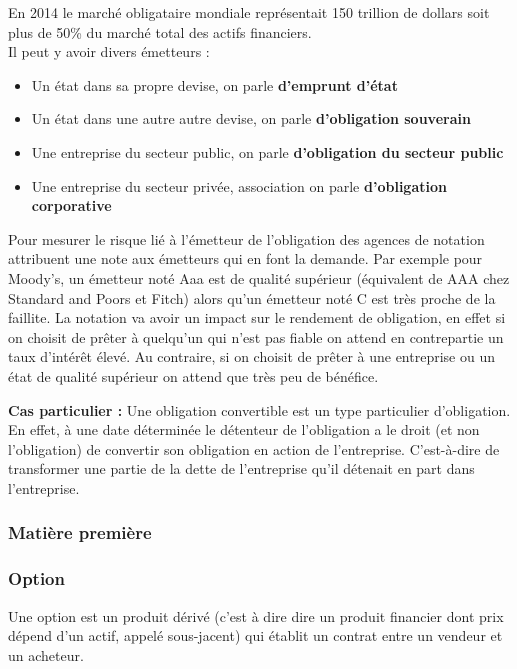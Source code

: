 En 2014 le marché obligataire mondiale représentait 150 trillion de dollars soit plus de 50\% du marché total des actifs financiers. \\

Il peut y avoir divers émetteurs :
\begin{itemize}
\item Un état dans sa propre devise, on parle \textbf{d'emprunt d'état}
\item Un état dans une autre autre devise, on parle \textbf{d'obligation souverain}
\item Une entreprise du secteur public, on parle \textbf{d'obligation du secteur public}
\item Une entreprise du secteur privée, association on parle \textbf{d'obligation corporative}
\end{itemize}

Pour mesurer le risque lié à l'émetteur de l'obligation des agences de notation attribuent une note aux émetteurs qui en font la demande. Par exemple pour Moody's, un émetteur noté Aaa est de qualité supérieur (équivalent de AAA chez Standard and Poors et Fitch) alors qu'un émetteur noté C est très proche de la faillite. La notation va avoir un impact sur le rendement de obligation, en effet si on choisit de prêter à quelqu'un qui n'est pas fiable on attend en contrepartie un taux d'intérêt élevé. Au contraire, si on choisit de prêter à une entreprise ou un état de qualité supérieur on attend que très peu de bénéfice. 

\textbf{Cas particulier : } Une obligation convertible est un type particulier d'obligation. En effet, à une date déterminée le détenteur de l'obligation a le droit (et non l'obligation) de convertir son obligation en action de l'entreprise. C'est-à-dire de transformer une partie de la dette de l'entreprise qu'il détenait en part dans l'entreprise. 

\subsubsection{Matière première}

\subsubsection{Option}
Une option est un produit dérivé (c'est à dire dire un produit financier dont prix dépend d'un actif, appelé sous-jacent) qui établit un contrat entre un vendeur et un acheteur. \\

